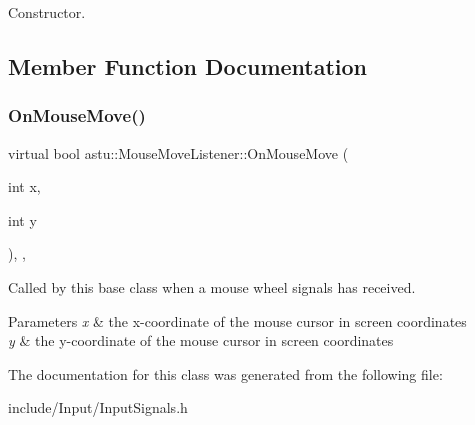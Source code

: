 Constructor. 

\subsection{Member Function Documentation}
\mbox{\label{classastu_1_1MouseMoveListener_a7d7602641d244ebc119a2210352c8593}} 
\subsubsection{\texorpdfstring{On\+Mouse\+Move()}{OnMouseMove()}}
{\footnotesize\ttfamily virtual bool astu\+::\+Mouse\+Move\+Listener\+::\+On\+Mouse\+Move (\begin{DoxyParamCaption}\item[{int}]{x,  }\item[{int}]{y }\end{DoxyParamCaption})\hspace{0.3cm}{\ttfamily [inline]}, {\ttfamily [protected]}, {\ttfamily [virtual]}}

Called by this base class when a mouse wheel signals has received.


\begin{DoxyParams}{Parameters}
{\em x} & the x-\/coordinate of the mouse cursor in screen coordinates \\
\hline
{\em y} & the y-\/coordinate of the mouse cursor in screen coordinates \\
\hline
\end{DoxyParams}


The documentation for this class was generated from the following file\+:\begin{DoxyCompactItemize}
\item 
include/\+Input/Input\+Signals.\+h\end{DoxyCompactItemize}
